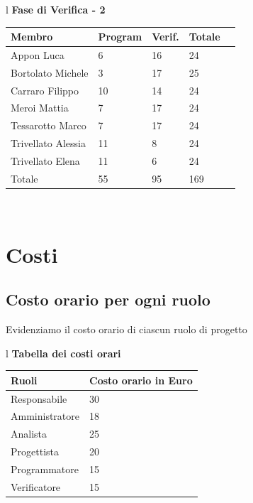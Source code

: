 \documentclass[11pt,titlepage,a4paper]{report}
\begin{document}
\begin{table}[hbtp]
\large{
\begin{tabular}{l}
\Large{\textbf{\textsf{Fase di Verifica - 2}}} \\
\begin{tabular}{||p{3.5cm}||p{2cm}||p{2cm}||p{2cm}||p{2cm}||}
\hline
\textbf{Membro} & \textbf{Program} & \textbf{Verif.} & \textbf{Totale}\\
\hline
{Appon Luca}&6&16&24 \\ 
\hline 
{Bortolato Michele} &3&17&25\\ 
\hline
{Carraro Filippo}&10&14&24 \\
\hline
{Meroi Mattia}&7&17&24\\
\hline
{Tessarotto Marco} &7&17&24\\
\hline
{Trivellato Alessia} &11&8&24 \\
\hline
{Trivellato Elena} &11&6&24 \\
\hline
{Totale} &55&95&169 \\
\hline
\end{tabular} \\
\end{tabular}
}
\end{table}

\chapter{Costi}
\section{Costo orario per ogni ruolo}
Evidenziamo il costo orario di ciascun ruolo di progetto
\begin{table}[hbtp]
\large{
\begin{tabular}{l}
\Large{\textbf{\textsf{Tabella dei costi orari}}} \\
\begin{tabular}{||p{6cm}||p{5cm}||}
\hline
\textbf{Ruoli} & \textbf{Costo orario in Euro}\\
\hline
{Responsabile}&30\\ 
\hline 
{Amministratore} &18\\ 
\hline
{Analista} &25 \\
\hline
{Progettista} &20 \\
\hline
{Programmatore} &15\\
\hline
{Verificatore} &15 \\
\hline
\end{tabular} \\
\end{tabular}
}
\end{table}
\end{document}
